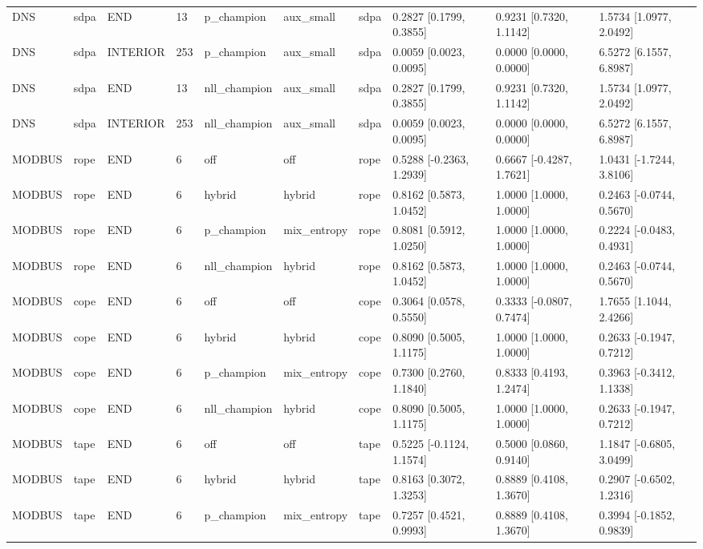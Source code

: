 \begin{tabular}{llllllllll}
DNS & sdpa & END & 13 & p\_champion & aux\_small & sdpa & 0.2827 [0.1799, 0.3855] & 0.9231 [0.7320, 1.1142] & 1.5734 [1.0977, 2.0492] \\
DNS & sdpa & INTERIOR & 253 & p\_champion & aux\_small & sdpa & 0.0059 [0.0023, 0.0095] & 0.0000 [0.0000, 0.0000] & 6.5272 [6.1557, 6.8987] \\
DNS & sdpa & END & 13 & nll\_champion & aux\_small & sdpa & 0.2827 [0.1799, 0.3855] & 0.9231 [0.7320, 1.1142] & 1.5734 [1.0977, 2.0492] \\
DNS & sdpa & INTERIOR & 253 & nll\_champion & aux\_small & sdpa & 0.0059 [0.0023, 0.0095] & 0.0000 [0.0000, 0.0000] & 6.5272 [6.1557, 6.8987] \\
MODBUS & rope & END & 6 & off & off & rope & 0.5288 [-0.2363, 1.2939] & 0.6667 [-0.4287, 1.7621] & 1.0431 [-1.7244, 3.8106] \\
MODBUS & rope & END & 6 & hybrid & hybrid & rope & 0.8162 [0.5873, 1.0452] & 1.0000 [1.0000, 1.0000] & 0.2463 [-0.0744, 0.5670] \\
MODBUS & rope & END & 6 & p\_champion & mix\_entropy & rope & 0.8081 [0.5912, 1.0250] & 1.0000 [1.0000, 1.0000] & 0.2224 [-0.0483, 0.4931] \\
MODBUS & rope & END & 6 & nll\_champion & hybrid & rope & 0.8162 [0.5873, 1.0452] & 1.0000 [1.0000, 1.0000] & 0.2463 [-0.0744, 0.5670] \\
MODBUS & cope & END & 6 & off & off & cope & 0.3064 [0.0578, 0.5550] & 0.3333 [-0.0807, 0.7474] & 1.7655 [1.1044, 2.4266] \\
MODBUS & cope & END & 6 & hybrid & hybrid & cope & 0.8090 [0.5005, 1.1175] & 1.0000 [1.0000, 1.0000] & 0.2633 [-0.1947, 0.7212] \\
MODBUS & cope & END & 6 & p\_champion & mix\_entropy & cope & 0.7300 [0.2760, 1.1840] & 0.8333 [0.4193, 1.2474] & 0.3963 [-0.3412, 1.1338] \\
MODBUS & cope & END & 6 & nll\_champion & hybrid & cope & 0.8090 [0.5005, 1.1175] & 1.0000 [1.0000, 1.0000] & 0.2633 [-0.1947, 0.7212] \\
MODBUS & tape & END & 6 & off & off & tape & 0.5225 [-0.1124, 1.1574] & 0.5000 [0.0860, 0.9140] & 1.1847 [-0.6805, 3.0499] \\
MODBUS & tape & END & 6 & hybrid & hybrid & tape & 0.8163 [0.3072, 1.3253] & 0.8889 [0.4108, 1.3670] & 0.2907 [-0.6502, 1.2316] \\
MODBUS & tape & END & 6 & p\_champion & mix\_entropy & tape & 0.7257 [0.4521, 0.9993] & 0.8889 [0.4108, 1.3670] & 0.3994 [-0.1852, 0.9839] \\

\end{tabular}
